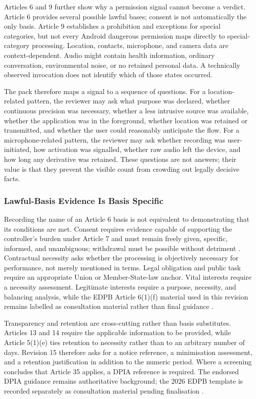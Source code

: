 Articles 6 and 9 further show why a permission signal cannot become a verdict. Article 6 provides several possible lawful bases; consent is not automatically the only basis. Article 9 establishes a prohibition and exceptions for special categories, but not every Android dangerous permission maps directly to special-category processing. Location, contacts, microphone, and camera data are context-dependent. Audio might contain health information, ordinary conversation, environmental noise, or no retained personal data. A technically observed invocation does not identify which of those states occurred.

The pack therefore maps a signal to a sequence of questions. For a location-related pattern, the reviewer may ask what purpose was declared, whether continuous precision was necessary, whether a less intrusive source was available, whether the application was in the foreground, whether location was retained or transmitted, and whether the user could reasonably anticipate the flow. For a microphone-related pattern, the reviewer may ask whether recording was user-initiated, how activation was signalled, whether raw audio left the device, and how long any derivative was retained. These questions are not answers; their value is that they prevent the visible count from crowding out legally decisive facts.

\subsubsection{Lawful-Basis Evidence Is Basis Specific}

Recording the name of an Article 6 basis is not equivalent to demonstrating that its conditions are met. Consent requires evidence capable of supporting the controller's burden under Article 7 and must remain freely given, specific, informed, and unambiguous; withdrawal must be possible without detriment \cite{eurlex2016,edpbconsent2020}. Contractual necessity asks whether the processing is objectively necessary for performance, not merely mentioned in terms. Legal obligation and public task require an appropriate Union or Member-State-law anchor. Vital interests require a necessity assessment. Legitimate interests require a purpose, necessity, and balancing analysis, while the EDPB Article 6(1)(f) material used in this revision remains labelled as consultation material rather than final guidance \cite{edpblia2024draft}.

Transparency and retention are cross-cutting rather than basis substitutes. Articles 13 and 14 require the applicable information to be provided, while Article 5(1)(e) ties retention to necessity rather than to an arbitrary number of days. Revision 15 therefore asks for a notice reference, a minimisation assessment, and a retention justification in addition to the numeric period. Where a screening concludes that Article 35 applies, a DPIA reference is required. The endorsed DPIA guidance remains authoritative background; the 2026 EDPB template is recorded separately as consultation material pending finalisation \cite{edpbwp29endorsed,edpbdpia2026consultation}.


